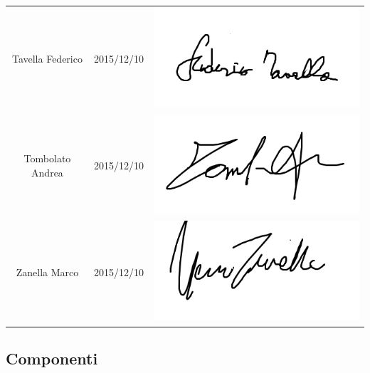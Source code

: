 \documentclass[PianoProgetto.tex]{subfiles}
\begin{document}
\begin{appendices}
\begin{table}[h]
\begin{tabularx}{\textwidth}{C C C}
			Tavella Federico & 2015/12/10 &	 \includegraphics[scale=0.3, trim=0 2.3cm 0 0.3cm]{firme_componenti/ftavella_firma} \\[1.2ex]
			Tombolato Andrea & 2015/12/10 &	 \includegraphics[scale=0.3, trim=0 2.3cm 0 0.3cm]{firme_componenti/atombola_firma} \\[1.2ex]
			Zanella Marco & 2015/12/10 &	\includegraphics[scale=0.3, trim=0 2.3cm 0 0.3cm]{firme_componenti/mzanella_firma} \\[1.2ex]
			\bottomrule
		\end{tabularx}
		
	\end{table}
				
	\clearpage
	
	\subsection{Componenti}
	
		\begin{table}[h]
	

\end{table}
\end{appendices}
\end{document}

